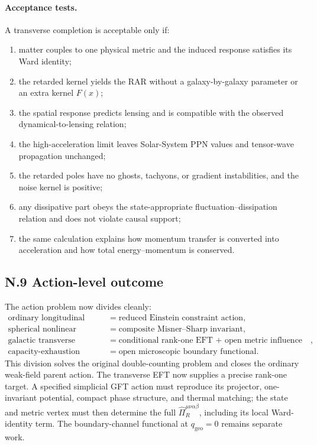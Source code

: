 \documentclass[11pt]{article}
\begin{document}
\paragraph{Acceptance tests.}
A transverse completion is acceptable only if:
\begin{enumerate}
\item matter couples to one physical metric and the induced response satisfies its Ward identity;
\item the retarded kernel yields the RAR without a galaxy-by-galaxy parameter or an extra kernel $F(x)$;
\item the spatial response predicts lensing and is compatible with the observed dynamical-to-lensing relation;
\item the high-acceleration limit leaves Solar-System PPN values and tensor-wave propagation unchanged;
\item the retarded poles have no ghosts, tachyons, or gradient instabilities, and the noise kernel is positive;
\item any dissipative part obeys the state-appropriate fluctuation--dissipation relation and does not violate causal support;
\item the same calculation explains how momentum transfer is converted into acceleration and how total energy--momentum is conserved.
\end{enumerate}

\subsection*{N.9 Action-level outcome}

The action problem now divides cleanly:
\[
\boxed{
\begin{aligned}
\text{ordinary longitudinal capacity}
&=\text{reduced Einstein constraint action},\\
\text{spherical nonlinear capacity}
&=\text{composite Misner--Sharp invariant},\\
\text{galactic transverse response}
&=\text{conditional rank-one EFT + open metric influence functional},\\
\text{capacity-exhaustion boundary}
&=\text{open microscopic boundary functional}.
\end{aligned}
}
\]
This division solves the original double-counting problem and closes the ordinary weak-field parent action. The transverse EFT now supplies a precise rank-one target. A specified simplicial GFT action must reproduce its projector, one-invariant potential, compact phase structure, and thermal matching; the state and metric vertex must then determine the full $\widehat\Pi_R^{\mu\nu\alpha\beta}$, including its local Ward-identity term. The boundary-channel functional at $q_{\mathrm{geo}}=0$ remains separate work.
\end{document}
